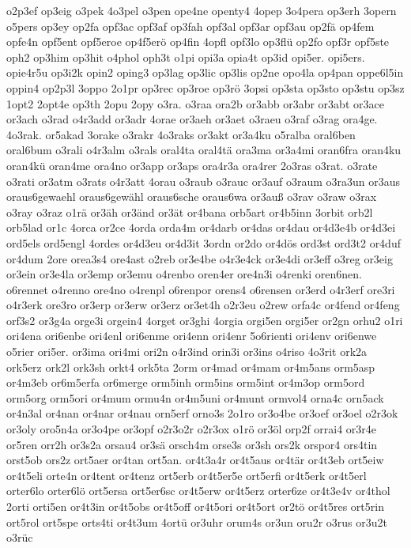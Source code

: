 {o2p3ef
op3eig
o3pek
4o3pel
o3pen
ope4ne
openty4
4opep
3o4pera
op3erh
3opern
o5pers
op3ey
op2fa
opf3ac
opf3af
op3fah
opf3al
opf3ar
opf3au
op2fä
op4fem
opfe4n
opf5ent
opf5eroe
op4f5erö
op4fin
4opfl
opf3lo
op3flü
op2fo
opf3r
opf5ste
oph2
op3him
op3hit
o4phol
oph3t
o1pi
opi3a
opia4t
op3id
opi5er.
opi5ers.
opie4r5u
op3i2k
opin2
oping3
op3lag
op3lic
op3lis
op2ne
opo4la
op4pan
oppe6l5in
oppin4
op2p3l
3oppo
2o1pr
op3rec
op3roe
op3rö
3opsi
op3sta
op3sto
op3stu
op3sz
1opt2
2opt4e
op3th
2opu
2opy
o3ra.
o3raa
ora2b
or3abb
or3abr
or3abt
or3ace
or3ach
o3rad
o4r3add
or3adr
4orae
or3aeh
or3aet
o3raeu
o3raf
o3rag
ora4ge.
4o3rak.
or5akad
3orake
o3rakr
4o3raks
or3akt
or3a4ku
o5ralba
oral6ben
oral6bum
o3rali
o4r3alm
o3rals
oral4ta
oral4tä
ora3ma
or3a4mi
oran6fra
oran4ku
oran4kü
oran4me
ora4no
or3app
or3aps
ora4r3a
ora4rer
2o3ras
o3rat.
o3rate
o3rati
or3atm
o3rats
o4r3att
4orau
o3raub
o3rauc
or3auf
o3raum
o3ra3un
or3aus
oraus6gewaehl
oraus6gewähl
oraus6sche
oraus6wa
or3auß
o3rav
o3raw
o3rax
o3ray
o3raz
o1rä
or3äh
or3änd
or3ät
or4bana
orb5art
or4b5inn
3orbit
orb2l
orb5lad
or1c
4orca
or2ce
4orda
orda4m
or4darb
or4das
or4dau
or4d3e4b
or4d3ei
ord5els
ord5engl
4ordes
or4d3eu
or4d3it
3ordn
or2do
or4dös
ord3st
ord3t2
or4duf
or4dum
2ore
orea3s4
ore4ast
o2reb
or3e4be
o4r3e4ck
or3e4di
or3eff
o3reg
or3eig
or3ein
or3e4la
or3emp
or3emu
o4renbo
oren4er
ore4n3i
o4renki
oren6nen.
o6rennet
o4renno
ore4no
o4renpl
o6renpor
orens4
o6rensen
or3erd
o4r3erf
ore3ri
o4r3erk
ore3ro
or3erp
or3erw
or3erz
or3et4h
o2r3eu
o2rew
orfa4c
or4fend
or4feng
orf3s2
or3g4a
orge3i
orgein4
4orget
or3ghi
4orgia
orgi5en
orgi5er
or2gn
orhu2
o1ri
ori4ena
ori6enbe
ori4enl
ori6enme
ori4enn
ori4enr
5o6rienti
ori4env
ori6enwe
o5rier
ori5er.
or3ima
ori4mi
ori2n
o4r3ind
orin3i
or3ins
o4riso
4o3rit
ork2a
ork5erz
ork2l
ork3sh
orkt4
ork5ta
2orm
or4mad
or4mam
or4m5ans
orm5asp
or4m3eb
or6m5erfa
or6merge
orm5inh
orm5ins
orm5int
or4m3op
orm5ord
orm5org
orm5ori
or4mum
ormu4n
or4m5uni
or4munt
ormvol4
orna4c
orn5ack
or4n3al
or4nan
or4nar
or4nau
orn5erf
orno3s
2o1ro
or3o4be
or3oef
or3oel
o2r3ok
or3oly
oro5n4a
or3o4pe
or3opf
o2r3o2r
o2r3ox
o1rö
or3öl
orp2f
orrai4
or3r4e
or5ren
orr2h
or3s2a
orsau4
or3sä
orsch4m
orse3s
or3sh
ors2k
orspor4
ors4tin
orst5ob
ors2z
ort5aer
or4tan
ort5an.
or4t3a4r
or4t5aus
or4tär
or4t3eb
ort5eiw
or4t5eli
orte4n
or4tent
or4tenz
ort5erb
or4t5er5e
ort5erfi
or4t5erk
or4t5erl
orter6lo
orter6lö
ort5ersa
ort5er6sc
or4t5erw
or4t5erz
orter6ze
or4t3e4v
or4thol
2orti
orti5en
or4t3in
or4t5obs
or4t5off
or4t5ori
or4t5ort
or2tö
or4t5res
ort5rin
ort5rol
ort5spe
orts4ti
or4t3um
4ortü
or3uhr
orum4s
or3un
oru2r
o3rus
or3u2t
o3rüc
}
